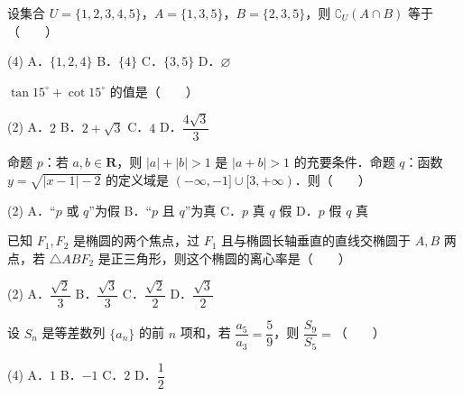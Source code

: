 

\begin{question}
设集合 $U = \{1, 2, 3, 4, 5\}$，$A = \{1, 3, 5\}$，$B = \{2, 3, 5\}$，则 $\complement_U (A \cap B)$ 等于\mbox{（　　）}

\begin{gkopts}(4)
\task A．$\{1, 2, 4\}$
\task B．$\{4\}$
\task C．$\{3, 5\}$
\task D．$\varnothing$
\end{gkopts}

\end{question}
\begin{question}
$\tan 15^\circ + \cot 15^\circ$ 的值是\mbox{（　　）}

\begin{gkopts}(2)
\task A．$2$
\task B．$2 + \sqrt{3}$
\task C．$4$
\task D．$\dfrac{4\sqrt{3}}{3}$
\end{gkopts}

\end{question}
\begin{question}
命题 $p$：若 $a, b \in \mathbf{R}$，则 $|a| + |b| > 1$ 是 $|a + b| > 1$ 的充要条件．命题 $q$：函数 $y = \sqrt{|x - 1| - 2}$ 的定义域是 $(-\infty, -1] \cup [3, +\infty)$．则\mbox{（　　）}

\begin{gkopts}(2)
\task A．“$p$ 或 $q$”为假
\task B．“$p$ 且 $q$”为真
\task C．$p$ 真 $q$ 假
\task D．$p$ 假 $q$ 真
\end{gkopts}

\end{question}
\begin{question}
已知 $F_1, F_2$ 是椭圆的两个焦点，过 $F_1$ 且与椭圆长轴垂直的直线交椭圆于 $A, B$ 两点，若 $\triangle ABF_2$ 是正三角形，则这个椭圆的离心率是\mbox{（　　）}

\begin{gkopts}(2)
\task A．$\dfrac{\sqrt{2}}{3}$
\task B．$\dfrac{\sqrt{3}}{3}$
\task C．$\dfrac{\sqrt{2}}{2}$
\task D．$\dfrac{\sqrt{3}}{2}$
\end{gkopts}

\end{question}
\begin{question}
设 $S_n$ 是等差数列 $\{a_n\}$ 的前 $n$ 项和，若 $\dfrac{a_5}{a_3} = \dfrac{5}{9}$，则 $\dfrac{S_9}{S_5} = $\mbox{（　　）}

\begin{gkopts}(4)
\task A．$1$
\task B．$-1$
\task C．$2$
\task D．$\dfrac{1}{2}$
\end{gkopts}

\end{question}
